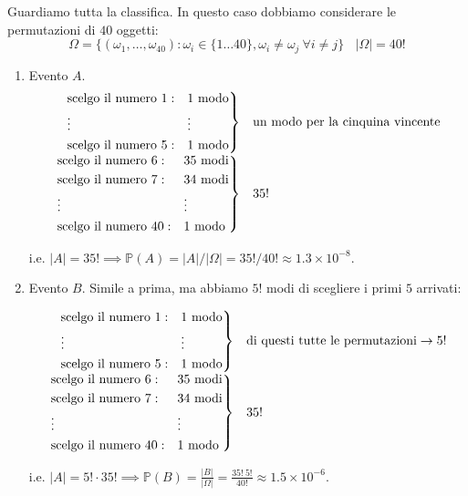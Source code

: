 Guardiamo tutta la classifica. In questo caso dobbiamo considerare le permutazioni di $40$ oggetti:
\begin{equation*}
\Omega =\{( \omega _{1} ,\dots ,\omega _{40}) :\omega _{i} \in \{1\dots 40\} ,\omega _{i} \neq \omega _{j} \ \forall i\neq j\} \ \ \ \ | \Omega | =40!
\end{equation*}
\begin{enumerate}
\item Evento $A$.\begin{equation*}
\begin{array}{ r l }
\begin{drcases}
\text{scelgo il numero} \ 1: & 1\ \text{modo}\\
\vdots  & \vdots \\
\text{scelgo il numero} \ 5: & 1\ \text{modo}
\end{drcases} & \text{un modo per la cinquina vincente}\\
\begin{drcases}
\text{scelgo il numero} \ 6: & 35\ \text{modi}\\
\text{scelgo il numero} \ 7: & 34\ \text{modi}\\
\vdots  & \vdots \\
\text{scelgo il numero} \ 40: & 1\ \text{modo}
\end{drcases} & 35!
\end{array}
\end{equation*}

i.e. $| A| =35!\implies \mathbb{P}( A) =| A| /| \Omega | =35!/40!\approx 1.3\times 10^{-8}$.
\item Evento $B$. Simile a prima, ma abbiamo $5!$ modi di scegliere i primi $5$ arrivati:

\begin{equation*}
\begin{array}{ r l }
\begin{drcases}
\text{scelgo il numero} \ 1: & 1\ \text{modo}\\
\vdots  & \vdots \\
\text{scelgo il numero} \ 5: & 1\ \text{modo}
\end{drcases} & \text{di questi tutte le permutazioni}\rightarrow 5!\\
\begin{drcases}
\text{scelgo il numero} \ 6: & 35\ \text{modi}\\
\text{scelgo il numero} \ 7: & 34\ \text{modi}\\
\vdots  & \vdots \\
\text{scelgo il numero} \ 40: & 1\ \text{modo}
\end{drcases} & 35!
\end{array}
\end{equation*}

i.e. $| A| =5!\cdot 35!\implies \mathbb{P}( B) =\frac{| B| }{| \Omega | } =\frac{35!\ 5!}{40!} \approx 1.5\times 10^{-6}$.
\end{enumerate}

